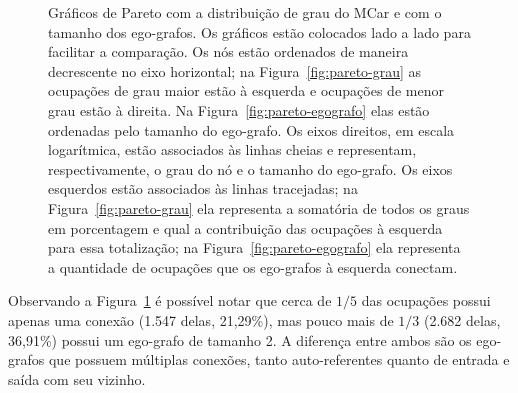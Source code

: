 \documentclass[12pt,a4paper]{article}
\begin{document}
\begin{figure}[htb]
    \centering
    \caption{Gráficos de Pareto com a distribuição de grau  do MCar e com o tamanho dos ego-grafos. Os gráficos estão colocados lado a lado para facilitar a comparação. Os nós estão ordenados de maneira decrescente no eixo horizontal; na Figura~\ref{fig:pareto-grau}  as ocupações de grau maior estão à esquerda e ocupações de menor grau estão à direita. Na Figura~\ref{fig:pareto-egografo} elas estão ordenadas pelo tamanho do ego-grafo. Os eixos direitos, em escala logarítmica, estão associados às linhas cheias e representam, respectivamente, o grau do nó e o tamanho do ego-grafo. Os eixos esquerdos estão associados às linhas tracejadas; na Figura~\ref{fig:pareto-grau} ela representa a somatória de todos os graus em porcentagem e qual a contribuição das ocupações à esquerda para essa totalização; na Figura~\ref{fig:pareto-egografo} ela representa a quantidade de ocupações que os ego-grafos à esquerda conectam.}
    \label{fig:paretos}
\end{figure}

Observando a Figura~\ref{fig:paretos} é possível notar que cerca de $1/5$ das ocupações possui apenas uma conexão (1.547 delas, 21,29\%), mas pouco mais de $1/3$ (2.682 delas, 36,91\%) possui um ego-grafo de tamanho 2. A diferença entre ambos são os ego-grafos que possuem múltiplas conexões, tanto auto-referentes quanto de entrada e saída com seu vizinho.
\end{document}
